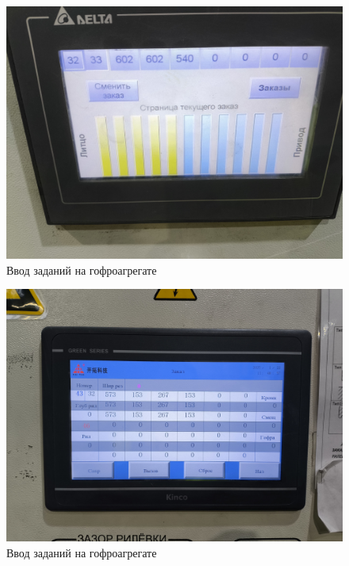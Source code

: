 \begin{figure}
\begin{center}
 \includegraphics[height=0.38\textheight, keepaspectratio]{Pics/V задание на резке.jpg}
\end{center}
 \caption{Ввод заданий на гофроагрегате}
 \label{pic:V задание на резке}
\end{figure}

\begin{figure}
\begin{center}
 \includegraphics[height=0.38\textheight, keepaspectratio]{Pics/V задание рилевки.jpg}
\end{center}
 \caption{Ввод заданий на гофроагрегате}
 \label{pic:V задание рилевки}
\end{figure}

